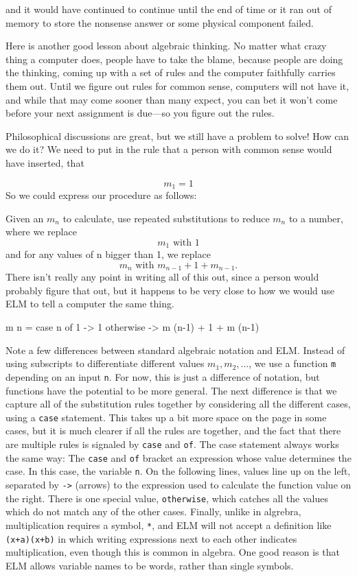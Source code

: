 \documentclass[12pt]{amsbook}
\newcommand{\elm}[1]{\texttt{#1}}
\begin{document}
and it would have continued to continue until the end of time or it ran out of memory to store the nonsense answer or some physical component failed.

Here is another good lesson about algebraic thinking.  No matter what crazy thing a computer does, people have to take the blame, because people are doing the thinking, coming up with a set of rules and the computer faithfully carries them out.  Until we figure out rules for common sense, computers will not have it, and while that may come sooner than many expect, you can bet it won't come before your next assignment is due---so you figure out the rules.

Philosophical discussions are great, but we still have a problem to solve!  How can we do it?  We need to put in the rule that a person with common sense would have inserted, that 

$$
m_1 = 1
$$
So we could express our procedure as follows:

Given an $m_n$ to calculate, use repeated substitutions to reduce $m_n$ to a number, where we replace
$$
m_1 \text{ with } 1
$$
and for any values of n bigger than 1, we replace
$$
m_n \text{ with } m_{n-1} + 1 + m_{n-1}.
$$
There isn't really any point in writing all of this out, since a person would probably figure that out, but it happens to be very close to how we would use ELM to tell a computer the same thing.

\begin{code}
m n = case n of
        1         -> 1
        otherwise -> m (n-1) + 1 + m (n-1)
\end{code}

Note a few differences between standard algebraic notation and ELM.  Instead of using subscripts to differentiate different values $m_1, m_2, ...$, we use a function \elm{m} depending on an input \elm{n}.  For now, this is just a difference of notation, but functions have the potential to be more general.  The next difference is that we capture all of the substitution rules together by considering all the different cases, using a \elm{case} statement.  This takes up a bit more space on the page in some cases, but it is much clearer if all the rules are together, and the fact that there are multiple rules is signaled by \elm{case} and \elm{of}.  The case statement always works the same way:  The \elm{case} and \elm{of} bracket an expression whose value determines the case.   In this case, the variable \elm{n}.  On the following lines, values line up on the left, separated by \elm{->} (arrows) to the expression used to calculate the function value on the right.  There is one special value, \elm{otherwise}, which catches all the values which do not match any of the other cases.  Finally, unlike in algrebra, multiplication requires a symbol, \elm{*}, and ELM will not accept a definition like \elm{(x+a)(x+b)} in which writing expressions next to each other indicates multiplication, even though this is common in algebra.  One good reason is that ELM allows variable names to be words, rather than single symbols.
\end{document}

